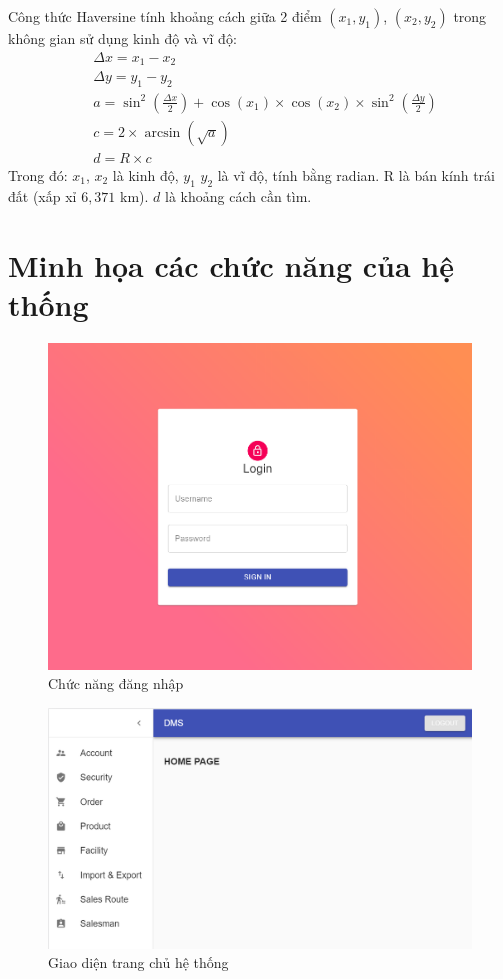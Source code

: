 Công thức Haversine tính khoảng cách giữa 2 
điểm $(x_1, y_1)$, $(x_2, y_2)$ trong không gian sử
dụng kinh độ và vĩ độ:
\begin{align*}
&\Delta x = x_1 - x_2 \\
&\Delta y = y_1 - y_2 \\
&a = \sin^2 \left( \frac{\Delta x}{2} \right)
    + \cos \left( x_1 \right) \times \cos \left( x_2 \right) 
    \times \sin^2 \left( \frac{\Delta y}{2} \right)
    \\
&c = 2 \times \arcsin \left( \sqrt{a} \right ) \\
&d = R \times c
\end{align*}
Trong đó: $x_1$, $x_2$ là kinh độ, $y_1$ $y_2$ là vĩ độ, tính bằng radian.
R là bán kính trái đất (xấp xỉ $6,371$ km). $d$ là khoảng cách cần tìm.

\section{Minh họa các chức năng của hệ thống}
\begin{figure}[H]
\centering
\includegraphics[width=12cm]{images/demo/login.png}
\caption{Chức năng đăng nhập}
\end{figure}

\begin{figure}[H]
\centering
\includegraphics[width=15cm]{images/demo/home-page.png}
\caption{Giao diện trang chủ hệ thống}
\end{figure}

